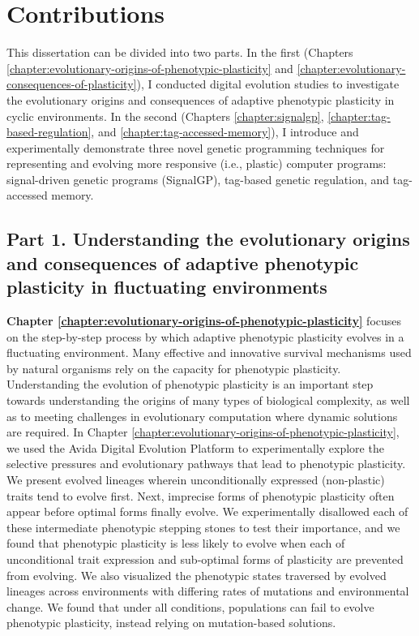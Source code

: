 \section{Contributions}


This dissertation can be divided into two parts.
In the first (Chapters \ref{chapter:evolutionary-origins-of-phenotypic-plasticity} and \ref{chapter:evolutionary-consequences-of-plasticity}), I conducted digital evolution studies to investigate the evolutionary origins and consequences of adaptive phenotypic plasticity in cyclic environments.
In the second (Chapters \ref{chapter:signalgp}, \ref{chapter:tag-based-regulation}, and \ref{chapter:tag-accessed-memory}), I introduce and experimentally demonstrate three novel genetic programming techniques for representing and evolving more responsive (i.e., plastic) computer programs: signal-driven genetic programs (SignalGP), tag-based genetic regulation, and tag-accessed memory.

\subsection{Part 1. Understanding the evolutionary origins and consequences of adaptive phenotypic plasticity in fluctuating environments}

\textbf{Chapter \ref{chapter:evolutionary-origins-of-phenotypic-plasticity}} focuses on the step-by-step process by which adaptive phenotypic plasticity evolves in a fluctuating environment.
Many effective and innovative survival mechanisms used by natural organisms rely on the capacity for phenotypic plasticity.
Understanding the evolution of phenotypic plasticity is an important step towards understanding the origins of many types of biological complexity, as well as to meeting challenges in evolutionary computation where dynamic solutions are required.
In Chapter \ref{chapter:evolutionary-origins-of-phenotypic-plasticity}, we used the Avida Digital Evolution Platform to experimentally explore the selective pressures and evolutionary pathways that lead to phenotypic plasticity.  
We present evolved lineages wherein unconditionally expressed (non-plastic) traits tend to evolve first.
Next, imprecise forms of phenotypic plasticity often appear before optimal forms finally evolve.   
We experimentally disallowed each of these intermediate phenotypic stepping stones to test their importance, and we found that phenotypic plasticity is less likely to evolve when each of unconditional trait expression and sub-optimal forms of plasticity are prevented from evolving. 
We also visualized the phenotypic states traversed by evolved lineages across environments with differing rates of mutations and environmental change. 
We found that under all conditions, populations can fail to evolve phenotypic plasticity, instead relying on mutation-based solutions.

